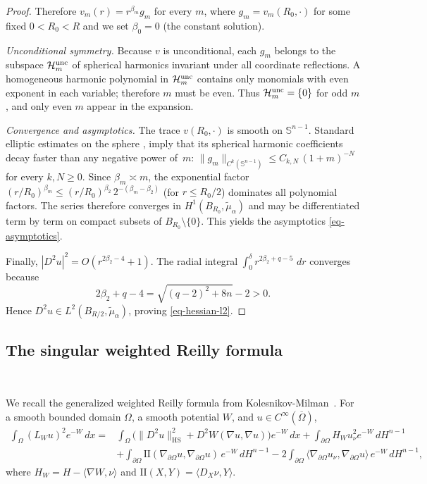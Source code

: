 \documentclass[12pt,leqno]{amsart}
\theoremstyle{plain} \newtheorem{thm}{Theorem}[section]
\theoremstyle{plain} \newtheorem{prop}[thm]{Proposition}
\theoremstyle{plain} \newtheorem{prob}[thm]{Problem}
\theoremstyle{definition} \newtheorem{defi}[thm]{Definition}
\theoremstyle{plain} \newtheorem{cor}[thm]{Corollary}
\theoremstyle{plain} \newtheorem{lem}[thm]{Lemma}
\theoremstyle{plain} \newtheorem{eg}{Example}[section]
\theoremstyle{remark} \newtheorem{rmk}[thm]{Remark}
\theoremstyle{plain} \newtheorem{conj}{Conjecture}
\numberwithin{equation}{section}
\newcommand{\cH}{\mathcal{H}}
\newcommand{\dd}{\,d}
\newcommand{\HS}{\mathrm{HS}}
\begin{document}
\begin{proof}
  Therefore $v_m(r)=r^{\beta_m}g_m$ for every $m$, where
  $g_m=v_m(R_0,\cdot)$ for some fixed $0<R_0<R$ and we set
  $\beta_0=0$ (the constant solution).

  \emph{Unconditional symmetry.}
  Because $v$ is unconditional, each $g_m$ belongs to the subspace
  $\cH_m^{\rm unc}$ of spherical harmonics invariant under all
  coordinate reflections.  A homogeneous harmonic polynomial in
  $\cH_m^{\rm unc}$ contains only monomials with even exponent in
  each variable; therefore $m$ must be even.  Thus
  $\cH_m^{\rm unc}=\{0\}$ for odd $m$, and only even $m$ appear in
  the expansion.

  \emph{Convergence and asymptotics.}
  The trace $v(R_0,\cdot)$ is smooth on $\mathbb{S}^{n-1}$.  Standard
  elliptic estimates on the sphere \cite[Section~3]{Gro96},
  \cite[Chapter~III]{Cha84} imply that its spherical harmonic
  coefficients decay faster than any negative power of~$m$:
  $\|g_m\|_{C^k(\mathbb{S}^{n-1})}\le C_{k,N}\,(1+m)^{-N}$ for every
  $k,N\ge0$.  Since $\beta_m\asymp m$, the exponential factor
  $(r/R_0)^{\beta_m}\le (r/R_0)^{\beta_2}\,2^{-(\beta_m-\beta_2)}$
  (for $r\le R_0/2$) dominates all polynomial factors.  The series
  therefore converges in $H^1(B_{R_0},\tilde{\mu}_\alpha)$ and may be
  differentiated term by term on compact subsets of
  $B_{R_0}\setminus\{0\}$.  This yields the asymptotics
  \eqref{eq-asymptotics}.

  Finally, $|D^2u|^2=O(r^{2\beta_2-4}+1)$.  The radial integral
  $\int_0^\delta r^{2\beta_2+q-5}\,\dd r$ converges because
  \[
    2\beta_2+q-4
    =\sqrt{(q-2)^2+8n}-2>0.
  \]
  Hence $D^2u\in L^2(B_{R/2},\tilde{\mu}_\alpha)$, proving
  \eqref{eq-hessian-l2}.
\end{proof}

\subsection{The singular weighted Reilly formula}\
\label{sec-singular-reilly}

We recall the generalized weighted Reilly formula from
Kolesnikov-Milman~\cite[Theorem~1.1]{KM18}. For a smooth bounded
domain $\Omega$, a smooth potential $W$, and
$u\in C^\infty(\overline\Omega)$,
\begin{equation}\label{eq-reilly-smooth}
  \begin{aligned}
    \int_\Omega(L_W u)^2 e^{-W}\dd x
    =&\int_\Omega\bigl(\|D^2u\|_{\HS}^2
       +D^2W(\nabla u,\nabla u)\bigr)e^{-W}\dd x
       +\int_{\partial\Omega}H_W u_\nu^2 e^{-W}\dd H^{n-1}\\
    &+\int_{\partial\Omega}\mathrm{II}(\nabla_{\partial\Omega}u,
       \nabla_{\partial\Omega}u)\,e^{-W}\dd H^{n-1}
       -2\int_{\partial\Omega}
       \langle\nabla_{\partial\Omega}u_\nu,
       \nabla_{\partial\Omega}u\rangle\,e^{-W}\dd H^{n-1},
  \end{aligned}
\end{equation}
where $H_W=H-\langle\nabla W,\nu\rangle$ and $\mathrm{II}(X,Y)=\langle D_X\nu,Y\rangle$.
\end{document}
